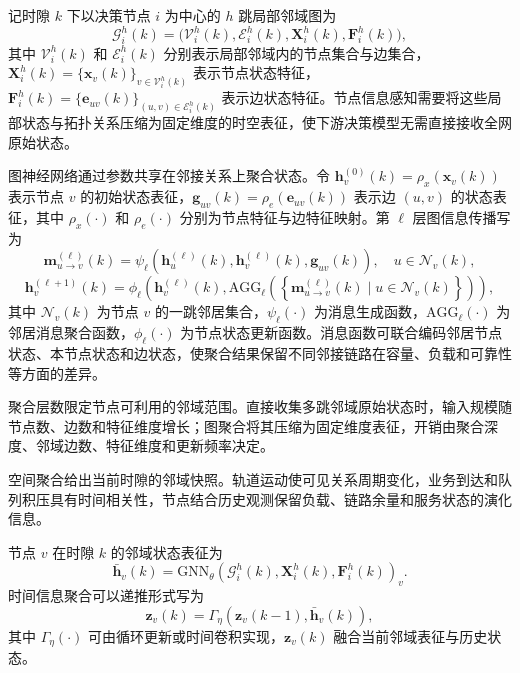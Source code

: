 记时隙 $k$ 下以决策节点 $i$ 为中心的 $h$ 跳局部邻域图为
\begin{equation}
    \mathcal G_i^h(k)=
    \big(\mathcal V_i^h(k),\mathcal E_i^h(k),
    \mathbf X_i^h(k),\mathbf F_i^h(k)\big),
\end{equation}
其中 $\mathcal V_i^h(k)$ 和 $\mathcal E_i^h(k)$ 分别表示局部邻域内的节点集合与边集合，$\mathbf X_i^h(k)=\{\mathbf x_v(k)\}_{v\in\mathcal V_i^h(k)}$ 表示节点状态特征，$\mathbf F_i^h(k)=\{\mathbf e_{uv}(k)\}_{(u,v)\in\mathcal E_i^h(k)}$ 表示边状态特征。节点信息感知需要将这些局部状态与拓扑关系压缩为固定维度的时空表征，使下游决策模型无需直接接收全网原始状态。

图神经网络通过参数共享在邻接关系上聚合状态\cite{Gilmer-MessagePassingNN-ICML17,battaglia2018relationalinductivebiasesdeep}。令 $\mathbf h_v^{(0)}(k)=\rho_x(\mathbf x_v(k))$ 表示节点 $v$ 的初始状态表征，$\mathbf g_{uv}(k)=\rho_e(\mathbf e_{uv}(k))$ 表示边 $(u,v)$ 的状态表征，其中 $\rho_x(\cdot)$ 和 $\rho_e(\cdot)$ 分别为节点特征与边特征映射。第 $\ell$ 层图信息传播写为
\begin{equation}
    \mathbf m_{u\rightarrow v}^{(\ell)}(k)
    =
    \psi_\ell
    \left(
    \mathbf h_u^{(\ell)}(k),
    \mathbf h_v^{(\ell)}(k),
    \mathbf g_{uv}(k)
    \right),
    \quad u\in\mathcal N_v(k),
\end{equation}
\begin{equation}
    \mathbf h_v^{(\ell+1)}(k)
    =
    \phi_\ell
    \left(
    \mathbf h_v^{(\ell)}(k),
    \mathrm{AGG}_\ell
    \left(
    \left\{
    \mathbf m_{u\rightarrow v}^{(\ell)}(k)
    \mid u\in\mathcal N_v(k)
    \right\}
    \right)
    \right),
\end{equation}
其中 $\mathcal N_v(k)$ 为节点 $v$ 的一跳邻居集合，$\psi_\ell(\cdot)$ 为消息生成函数，$\mathrm{AGG}_\ell(\cdot)$ 为邻居消息聚合函数，$\phi_\ell(\cdot)$ 为节点状态更新函数。消息函数可联合编码邻居节点状态、本节点状态和边状态，使聚合结果保留不同邻接链路在容量、负载和可靠性等方面的差异。

聚合层数限定节点可利用的邻域范围\cite{Hamilton-GraphSAGE-NIPS17}。直接收集多跳邻域原始状态时，输入规模随节点数、边数和特征维度增长；图聚合将其压缩为固定维度表征，开销由聚合深度、邻域边数、特征维度和更新频率决定。

空间聚合给出当前时隙的邻域快照。轨道运动使可见关系周期变化，业务到达和队列积压具有时间相关性，节点结合历史观测保留负载、链路余量和服务状态的演化信息。

节点 $v$ 在时隙 $k$ 的邻域状态表征为
\begin{equation}
    \bar{\mathbf h}_v(k)
    =
    \mathrm{GNN}_{\theta}
    \left(
    \mathcal G_i^h(k),
    \mathbf X_i^h(k),
    \mathbf F_i^h(k)
    \right)_v .
\end{equation}
时间信息聚合可以递推形式写为
\begin{equation}
    \mathbf z_v(k)
    =
    \Gamma_{\eta}
    \left(
    \mathbf z_v(k-1),
    \bar{\mathbf h}_v(k)
    \right),
\end{equation}
其中 $\Gamma_{\eta}(\cdot)$ 可由循环更新或时间卷积实现\cite{li2018diffusionconvolutionalrecurrentneural}，$\mathbf z_v(k)$ 融合当前邻域表征与历史状态。

